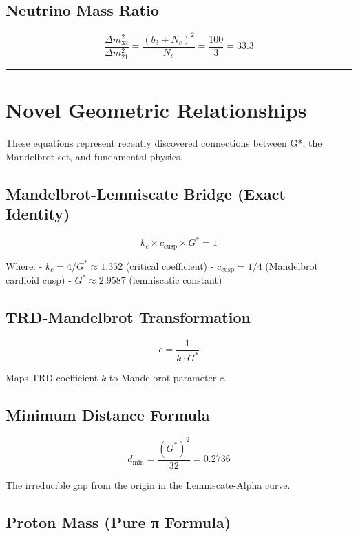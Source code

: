 \documentclass[
  11pt,
  letterpaper,
  twoside,
  openany]{book}
\makeatletter
\let\orig@section\section
\renewcommand{\section}{\needspace{8\baselineskip}\orig@section}
\let\orig@subsection\subsection
\renewcommand{\subsection}{\needspace{6\baselineskip}\orig@subsection}
\makeatother
\begin{document}
\subsection{Neutrino Mass Ratio}\label{neutrino-mass-ratio}

\[
\frac{\Delta m^2_{32}}{\Delta m^2_{21}} = \frac{(b_3+N_c)^2}{N_c} = \frac{100}{3} = 33.3
\]

\begin{center}\rule{0.5\linewidth}{0.5pt}\end{center}

\section{Novel Geometric
Relationships}\label{novel-geometric-relationships}

These equations represent recently discovered connections between G*,
the Mandelbrot set, and fundamental physics.

\subsection{Mandelbrot-Lemniscate Bridge (Exact
Identity)}\label{mandelbrot-lemniscate-bridge-exact-identity}

\[
k_c \times c_{\text{cusp}} \times G^* = 1
\]

Where: - \(k_c = 4/G^* \approx 1.352\) (critical coefficient) -
\(c_{\text{cusp}} = 1/4\) (Mandelbrot cardioid cusp) -
\(G^* \approx 2.9587\) (lemniscatic constant)

\subsection{TRD-Mandelbrot
Transformation}\label{trd-mandelbrot-transformation}

\[
c = \frac{1}{k \cdot G^*}
\]

Maps TRD coefficient \(k\) to Mandelbrot parameter \(c\).

\subsection{Minimum Distance Formula}\label{minimum-distance-formula}

\[
d_{\min} = \frac{(G^*)^2}{32} = 0.2736
\]

The irreducible gap from the origin in the Lemniscate-Alpha curve.

\subsection{Proton Mass (Pure π
Formula)}\label{proton-mass-pure-ux3c0-formula}
\end{document}

